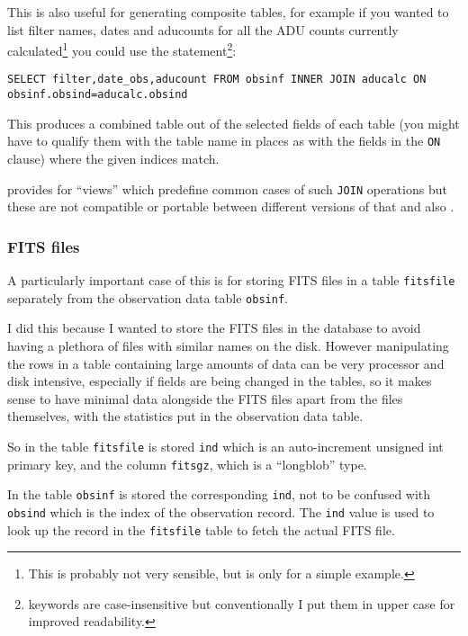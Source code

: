 This is also useful for generating composite tables, for example if you wanted
to list filter names, dates and aducounts for all the ADU counts currently
calculated\footnote{This is probably not very sensible, but is only for a
simple example.} you could use the statement\footnote{{\mysql} keywords are
case-insensitive but conventionally I put them in upper case for improved
readability.}:

\begin{verbatim}
SELECT filter,date_obs,aducount FROM obsinf INNER JOIN aducalc ON obsinf.obsind=aducalc.obsind
\end{verbatim}

This produces a combined table out of the selected fields of each table (you
might have to qualify them with the table name in places as with the fields in
the \texttt{ON} clause) where the given indices match.

{\mysql} provides for ``views'' which predefine common cases of such
\texttt{JOIN} operations but these are not compatible or portable between
different versions of that and also \maria.

\subsubsection{FITS files}
\protect\label{section:fitsindex}

A particularly important case of this is for storing FITS files in a
table \texttt{fitsfile} separately from the observation data table
\texttt{obsinf}.

I did this because I wanted to store the FITS files in the database to avoid
having a plethora of files with similar names on the disk. However manipulating
the rows in a table containing large amounts of data can be very processor and
disk intensive, especially if fields are being changed in the tables, so it
makes sense to have minimal data alongside the FITS files apart from the files
themselves, with the statistics put in the observation data table.

So in the table \texttt{fitsfile} is stored \texttt{ind} which is an
auto-increment unsigned int primary key, and the column \texttt{fitsgz}, which
is a ``longblob'' type.

In the table \texttt{obsinf} is stored the corresponding \texttt{ind}, not to be
confused with \texttt{obsind} which is the index of the observation record. The
\texttt{ind} value is used to look up the record in the \texttt{fitsfile} table
to fetch the actual FITS file.

